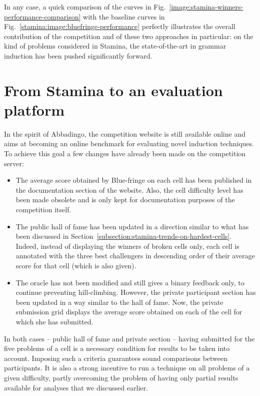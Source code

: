 In any case, a quick comparison of the curves in Fig.~\ref{image:stamina-winners-performance-comparison} with the baseline curves in Fig.~\ref{stamina:image:bluefringe-performance} perfectly illustrates the overall contribution of the competition and of these two approaches in particular: on the kind of problems considered in Stamina, the state-of-the-art in grammar induction has been pushed significantly forward.


\section{From Stamina to an evaluation platform\label{section:stamina-platform}}

In the spirit of Abbadingo, the competition website is still available online and aims at becoming an online benchmark for evaluating novel induction techniques. To achieve this goal a few changes have already been made on the competition server:

\begin{itemize}

\item The average score obtained by Blue-fringe on each cell has been published in the documentation section of the website. Also, the cell difficulty level has been made obsolete and is only kept for documentation purposes of the competition itself.

\item The public hall of fame has been updated in a direction similar to what has been discussed in Section~\ref{subsection:stamina-trends-on-hardest-cells}. Indeed, instead of displaying the winners of broken cells only, each cell is annotated with the three best challengers in descending order of their average score for that cell (which is also given). 

\item The oracle has not been modified and still gives a binary feedback only, to continue preventing hill-climbing. However, the private participant section has been updated in a way similar to the hall of fame. Now, the private submission grid displays the average score obtained on each of the cell for which she has submitted.

\end{itemize}

In both cases -- public hall of fame and private section -- having submitted for the five problems of a cell is a necessary condition for results to be taken into account. Imposing such a criteria guarantees sound comparisons between participants. It is also a strong incentive to run a technique on all problems of a given difficulty, partly overcoming the problem of having only partial results available for analyses that we discussed earlier.

